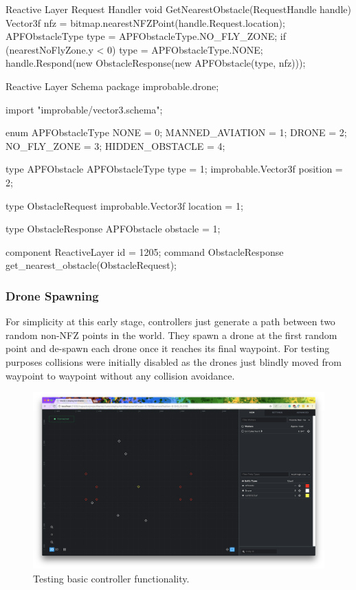 \documentclass[a4paper,12pt,titlepage]{article}
\begin{document}
\begin{sexylisting}[colback=white]{Reactive Layer Request Handler}
void GetNearestObstacle(RequestHandle handle)
{
  Vector3f nfz = bitmap.nearestNFZPoint(handle.Request.location);
  APFObstacleType type = APFObstacleType.NO_FLY_ZONE;
  if (nearestNoFlyZone.y < 0)
  {
    type = APFObstacleType.NONE;
  }
  handle.Respond(new ObstacleResponse(new APFObstacle(type, nfz)));
}
\end{sexylisting}

\begin{sexylisting}[colback=white]{Reactive Layer Schema}
package improbable.drone;

import "improbable/vector3.schema";

enum APFObstacleType {
  NONE = 0;
  MANNED_AVIATION = 1;
  DRONE = 2;
  NO_FLY_ZONE = 3;
  HIDDEN_OBSTACLE = 4;
}

type APFObstacle{
  APFObstacleType type = 1;
  improbable.Vector3f position = 2;
}

type ObstacleRequest {
  improbable.Vector3f location = 1;
}

type ObstacleResponse {
  APFObstacle obstacle = 1;
}

component ReactiveLayer {
  id = 1205;
  command ObstacleResponse get_nearest_obstacle(ObstacleRequest);
}
\end{sexylisting}

\subsubsection{Drone Spawning}
For simplicity at this early stage, controllers just generate a path between two random non-NFZ points in the world. They spawn a drone at the first random point and de-spawn each drone once it reaches its final waypoint. For testing purposes collisions were initially disabled as the drones just blindly moved from waypoint to waypoint without any collision avoidance.

\begin{figure}[!hbpt]
  \center
  \includegraphics[width=\linewidth]{img/gdoc1.png}
  \caption{Testing basic controller functionality.}
  \label{fig:basic_controller_test}
\end{figure}
\end{document}
